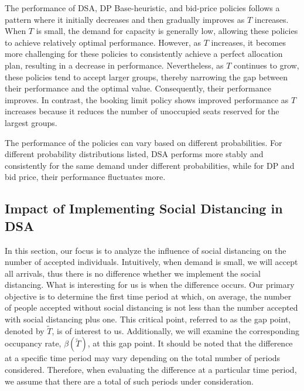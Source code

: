 
The performance of DSA, DP Base-heuristic, and bid-price policies follows a pattern where it initially decreases and then gradually improves as $T$ increases. When $T$ is small, the demand for capacity is generally low, allowing these policies to achieve relatively optimal performance. However, as $T$ increases, it becomes more challenging for these policies to consistently achieve a perfect allocation plan, resulting in a decrease in performance. Nevertheless, as $T$ continues to grow, these policies tend to accept larger groups, thereby narrowing the gap between their performance and the optimal value. Consequently, their performance improves. In contrast, the booking limit policy shows improved performance as $T$ increases because it reduces the number of unoccupied seats reserved for the largest groups.

The performance of the policies can vary based on different probabilities. For different probability distributions listed, DSA performs more stably and consistently for the same demand under different probabilities, while for DP and bid price, their performance fluctuates more.

\subsection{Impact of Implementing Social Distancing in DSA}
In this section, our focus is to analyze the influence of social distancing on the number of accepted individuals. Intuitively, when demand is small, we will accept all arrivals, thus there is no difference whether we implement the social distancing. What is interesting for us is when the difference occurs. Our primary objective is to determine the first time period at which, on average, the number of people accepted without social distancing is not less than the number accepted with social distancing plus one. This critical point, referred to as the gap point, denoted by $\tilde{T}$, is of interest to us. Additionally, we will examine the corresponding occupancy rate, $\beta(\tilde{T})$, at this gap point. It should be noted that the difference at a specific time period may vary depending on the total number of periods considered. Therefore, when evaluating the difference at a particular time period, we assume that there are a total of such periods under consideration.


